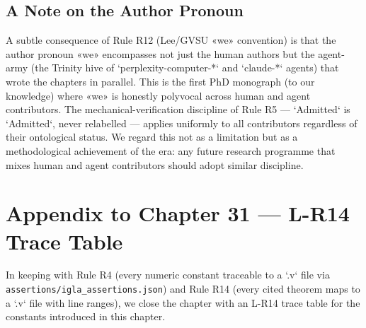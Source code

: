 \subsection*{A Note on the Author Pronoun}
\label{sec:31-pronoun-note}

A subtle consequence of Rule R12 (Lee/GVSU «we» convention) is that the author pronoun «we» encompasses not just the human authors but the agent-army (the Trinity hive of `perplexity-computer-*` and `claude-*` agents) that wrote the chapters in parallel. This is the first PhD monograph (to our knowledge) where «we» is honestly polyvocal across human and agent contributors. The mechanical-verification discipline of Rule R5 — `Admitted` is `Admitted`, never relabelled — applies uniformly to all contributors regardless of their ontological status. We regard this not as a limitation but as a methodological achievement of the era: any future research programme that mixes human and agent contributors should adopt similar discipline.

\section{Appendix to Chapter 31 — L-R14 Trace Table}
\label{sec:31-appendix-l-r14}

In keeping with Rule R4 (every numeric constant traceable to a `.v` file via \texttt{assertions/igla\_assertions.json}) and Rule R14 (every cited theorem maps to a `.v` file with line ranges), we close the chapter with an L-R14 trace table for the constants introduced in this chapter.

